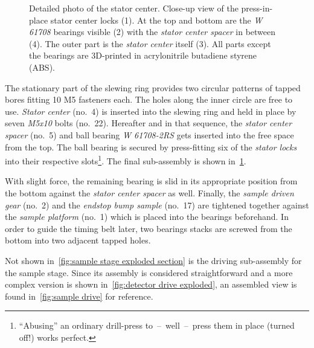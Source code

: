             \begin{figure}[!h]
                \centering
                
                \caption[Detailed photo of the stator center]{Detailed photo of the stator center. Close-up view of the press-in-place stator center locks (1). At the top and bottom are the \textit{W 61708} bearings visible (2) with the \textit{stator center spacer} in between (4). The outer part is the \textit{stator center} itself (3). All parts except the bearings are 3D-printed in acrylonitrile butadiene styrene (ABS).}%
                \label{fig:detailed view of the stator center}
            \end{figure}

            The stationary part of the slewing ring provides two circular patterns of tapped bores fitting 10 M5 fasteners each.
            The holes along the inner circle are free to use.
            \textit{Stator center} (no.~4) is inserted into the slewing ring and held in place by seven \textit{M5x10} bolts (no.~22).
            Hereafter and in that sequence, the \textit{stator center spacer} (no.~5) and ball bearing \textit{W 61708-2RS} gets inserted into the free space from the top.
            The ball bearing is secured by press-fitting six of the \textit{stator locks} into their respective slots\footnote{ ``Abusing'' an ordinary drill-press to~--~well~--~press them in place (turned off!) works perfect.}.
            The final sub-assembly is shown in~\cref{fig:detailed view of the stator center}.

            With slight force, the remaining bearing is slid in its appropriate position from the bottom against the \textit{stator center spacer} as well.
            Finally, the \textit{sample driven gear} (no.~2) and the \textit{endstop bump sample} (no.~17) are tightened together against the \textit{sample platform} (no.~1) which is placed into the bearings beforehand.
            In order to guide the timing belt later, two bearings stacks are screwed from the bottom into two adjacent tapped holes.\par\medskip

            Not shown in~\cref{fig:sample stage exploded section} is the driving sub-assembly for the sample stage.
            Since its assembly is considered straightforward and a more complex version is shown in~\cref{fig:detector drive exploded}, an assembled view is found in~\cref{fig:sample drive} for reference.

